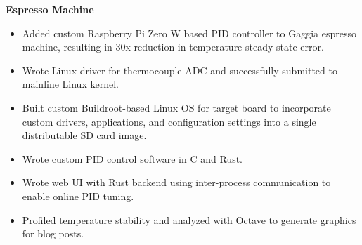 \noindent \textbf{Espresso Machine}
\begin{itemize}
    \item Added custom Raspberry Pi Zero W based PID controller to Gaggia espresso machine, resulting in 30x reduction in temperature steady state error.
    \item Wrote Linux driver for thermocouple ADC and successfully submitted to mainline Linux kernel.
    \item Built custom Buildroot-based Linux OS for target board to incorporate custom drivers, applications, and configuration settings into a single distributable SD card image.
    \item Wrote custom PID control software in C and Rust.
    \item Wrote web UI with Rust backend using inter-process communication to enable online PID tuning.
    \item Profiled temperature stability and analyzed with Octave to generate graphics for blog posts.
\end{itemize}

